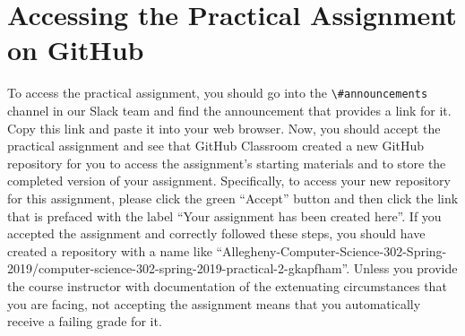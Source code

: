 \documentclass[11pt]{article}
\newcommand{\url}[1]{\lstinline{#1}}
\newcommand{\channel}[1]{\lstinline{#1}}
\begin{document}



\section*{Accessing the Practical Assignment on GitHub}

To access the practical assignment, you should go into the \channel{\#announcements} channel in our Slack team and find
the announcement that provides a link for it. Copy this link and paste it into your web browser. Now, you should accept
the practical assignment and see that GitHub Classroom created a new GitHub repository for you to access the
assignment's starting materials and to store the completed version of your assignment. Specifically, to access your new
repository for this assignment, please click the green ``Accept'' button and then click the link that is prefaced with
the label ``Your assignment has been created here''. If you accepted the assignment and correctly followed these steps,
you should have created a repository with a name like
``Allegheny-Computer-Science-302-Spring-2019/computer-science-302-spring-2019-practical-2-gkapfham''. Unless you provide
the course instructor with documentation of the extenuating circumstances that you are facing, not accepting the
assignment means that you automatically receive a failing grade for it.
\end{document}
